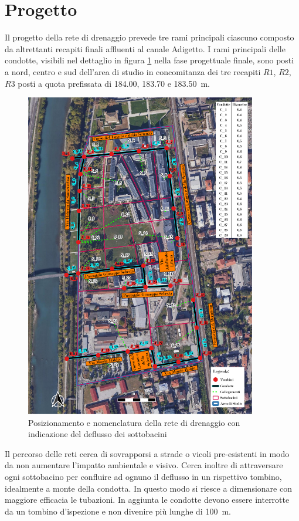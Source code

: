 \section{Progetto}
\label{cap:ProgettoCondotte}
Il progetto della rete di drenaggio prevede tre rami principali ciascuno composto da altrettanti recapiti finali affluenti al canale Adigetto. 
I rami principali delle condotte, visibili nel dettaglio in figura \ref{fig:Condotte} nella fase progettuale finale, sono posti a nord, centro e sud dell'area di studio in concomitanza dei tre recapiti $R1$, $R2$, $R3$ posti a quota prefissata di \SI{184.00}{}, \SI{183.70}{} e \SI{183.50}{\metre}.
\begin{figure}[p]
    \centering
    \includegraphics[trim=0cm 0cm 0cm 0cm,clip,frame,width=0.9\textwidth]{IMG/Nomenclatura_condotte.pdf} 
    \caption{Posizionamento e nomenclatura della rete di drenaggio con indicazione del deflusso dei sottobacini}
    \label{fig:Condotte}
\end{figure}

Il percorso delle reti cerca di sovrapporsi a strade o vicoli pre-esistenti in modo da non aumentare l'impatto ambientale e visivo. 
Cerca inoltre di attraversare ogni sottobacino per confluire ad ognuno il deflusso in un rispettivo tombino, idealmente a monte della condotta. 
In questo modo si riesce a dimensionare con maggiore efficacia le tubazioni. 
In aggiunta le condotte devono essere interrotte da un tombino d'ispezione e non divenire più lunghe di \SI{100}{\metre}.

